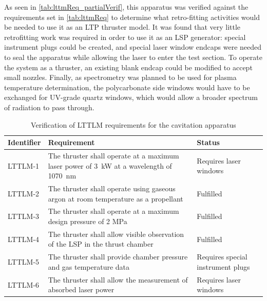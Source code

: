             As seen in \autoref{tab:lttmReq_partialVerif}, this apparatus was verified against the requirements set in \autoref{tab:lttmReq} to determine what retro-fitting activities would be needed to use it as an LTP thruster model. It was found that very little retrofitting work was required in order to use it as an LSP generator: special instrument plugs could be created, and special laser window endcaps were needed to seal the apparatus while allowing the laser to enter the test section. To operate the system as a thruster, an existing blank endcap could be modified to accept small nozzles. Finally, as spectrometry was planned to be used for plasma temperature determination, the polycarbonate side windows would have to be exchanged for UV-grade quartz windows, which would allow a broader spectrum of radiation to pass through.
        
            \begin{table}[h]
                \renewcommand{\arraystretch}{1.3}
                \centering
                \caption{Verification of LTTLM requirements for the cavitation apparatus}
                \label{tab:lttmReq_partialVerif}
                \begin{tabular}{l>{\raggedright}p{}p{}<{\raggedright}}
                    \toprule
                    \textbf{Identifier} & \textbf{Requirement}                                                                   & \textbf{Status}                   \\ \midrule
                    LTTLM-1             & The thruster shall operate at a maximum laser power of \qty{3}{kW} at a wavelength of \qty{1070}{nm} & Requires laser windows            \\
                    LTTLM-2             & The thruster shall operate using gaseous argon at room temperature as a propellant     & Fulfilled                         \\
                    LTTLM-3             & The thruster shall operate at a maximum design pressure of 2 MPa                       & Fulfilled                         \\
                    LTTLM-4             & The thruster shall allow visible observation of the LSP in the thrust chamber          & Fulfilled                         \\
                    LTTLM-5             & The thruster shall provide chamber pressure and gas temperature data                   & Requires special instrument plugs \\
                    LTTLM-6             & The thruster shall allow the measurement of absorbed laser power                       & Requires laser windows            \\ \bottomrule
                \end{tabular}
            \end{table}
            

